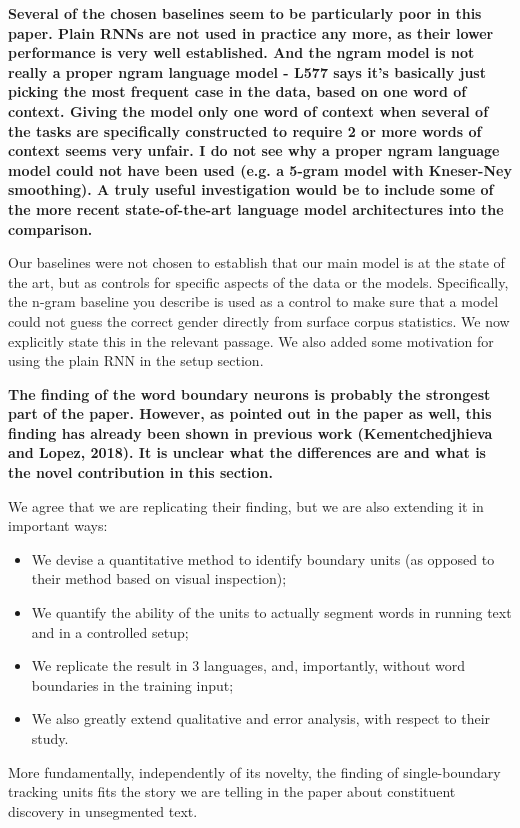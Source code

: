 \documentclass{article}[11pt,a4paper,oneside]
\begin{document}
\textbf{Several of the chosen baselines seem to be particularly poor in this paper.
Plain RNNs are not used in practice any more, as their lower performance is
very well established. And the ngram model is not really a proper ngram
language model - L577 says it's basically just picking the most frequent
case in the data, based on one word of context. Giving the model only one
word of context when several of the tasks are specifically constructed to
require 2 or more words of context seems very unfair. I do not see why a
proper ngram language model could not have been used (e.g. a 5-gram model
with Kneser-Ney smoothing). A truly useful investigation would be to include
some of the more recent state-of-the-art language model architectures into
the comparison.}

Our baselines were not chosen to establish that our main model is at the state of the art, but as controls for specific aspects of the data or the models. Specifically, the n-gram baseline you describe is used as a control to make sure that a model could not guess the correct gender directly from surface corpus statistics. We now explicitly state this in the relevant passage. We also added some motivation for using the plain RNN in the setup section.\newline

\textbf{The finding of the word boundary neurons is probably the strongest part of
the paper.
However, as pointed out in the paper as well, this finding has already been
shown in previous work (Kementchedjhieva and Lopez, 2018).
It is unclear what the differences are and what is the novel contribution in
this section.}

We agree that we are replicating their finding, but we are also extending it in important ways:
\begin{itemize}
\item We devise a quantitative method to identify boundary units (as opposed to their method based on visual inspection);
\item We quantify the ability of the units to actually segment words in running text and in a controlled setup;
\item We replicate the result in 3 languages, and, importantly, without word boundaries in the training input;
\item We also greatly extend qualitative and error analysis, with respect to their study.
\end{itemize}
More fundamentally, independently of its novelty, the finding of single-boundary tracking units fits the story we are telling in the paper about constituent discovery in unsegmented text.
\end{document}
